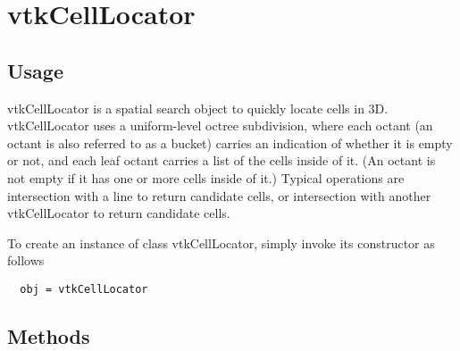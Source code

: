 \section{vtkCellLocator}

\subsection{Usage}

 vtkCellLocator is a spatial search object to quickly locate cells in 3D.
 vtkCellLocator uses a uniform-level octree subdivision, where each octant
 (an octant is also referred to as a bucket) carries an indication of
 whether it is empty or not, and each leaf octant carries a list of the
 cells inside of it. (An octant is not empty if it has one or more cells
 inside of it.)  Typical operations are intersection with a line to return
 candidate cells, or intersection with another vtkCellLocator to return
 candidate cells.

To create an instance of class vtkCellLocator, simply
invoke its constructor as follows
\begin{verbatim}
  obj = vtkCellLocator
\end{verbatim}
\subsection{Methods}

